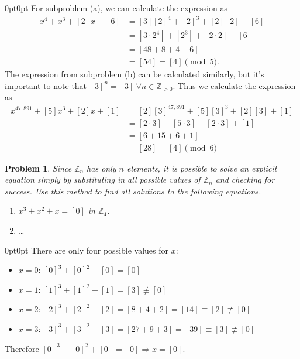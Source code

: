 \documentclass[12pt]{article}
\newtheorem{problem}{Problem}
\numberwithin{problem}{section} %
\theoremstyle{remark}  %
\newenvironment{answer}
    {\begin{adjustwidth}{0pt}{0pt}}
    {\end{adjustwidth}}
\begin{document}
    \begin{answer}
        For subproblem (a), we can calculate the expression as
        \begin{align*}
            [3]x^4+x^3+[2]x-[6] &= [3][2]^4 + [2]^3 + [2][2]-[6] \\
            &= [3\cdot 2^4] + [2^3] + [2\cdot 2] - [6] \\
            &= [48 + 8 + 4 - 6] \\
            &= \boxed{[54] = [4] \pmod{5}}.
        \end{align*}
        The expression from subproblem (b) can be calculated similarly, but it's important to note that $[3]^n=[3]\ \forall n\in\mathbb{Z}_{>0}$. Thus we calculate the expression as
        \begin{align*}
            [2]x^{47,891}+[5]x^3+[2]x+[1] &= [2][3]^{47,891}+[5][3]^3 +[2][3]+[1] \\
            &= [2 \cdot 3] + [5 \cdot 3] + [2 \cdot 3] + [1] \\
            &= [6 + 15 + 6 + 1] \\
            &= \boxed{[28] = [4] \pmod{6}}
        \end{align*}
    \end{answer}
\vspace{5pt}
    \begin{problem}
        Since $\mathbb{Z}_n$ has only $n$ elements, it is possible to solve an explicit equation simply by substituting in all possible values of $\mathbb{Z}_n$ and checking for success. Use this method to find all solutions to the following equations.
        \begin{enumerate}[label=(\alph*)]
            \item $x^3 + x^2 + x = [0]$ in $\mathbb{Z}_4$.
            \item \dots
        \end{enumerate}
    \end{problem}
    \begin{answer}
        There are only four possible values for $x$:
        \begin{itemize}
            \item $x=0$: $[0]^3+[0]^2 + [0] = [0]$
            \item $x=1$: $[1]^3+[1]^2 + [1] = [3] \not\equiv [0]$
            \item $x=2$: $[2]^3+[2]^2 + [2] = [8 + 4 + 2] = [14] \equiv [2] \not\equiv [0]$
            \item $x=3$: $[3]^3+[3]^2 + [3] = [27 + 9 + 3] = [39] \equiv [3] \not\equiv [0]$
        \end{itemize}
        Therefore $[0]^3+[0]^2 + [0] = [0] \Rightarrow x = [0]$.
    \end{answer}
\end{document}
